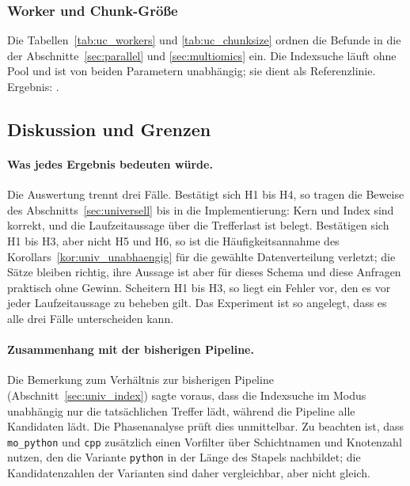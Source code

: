 \subsubsection{Worker und Chunk-Größe}


Die Tabellen~\ref{tab:uc_workers} und \ref{tab:uc_chunksize} ordnen die Befunde in die der Abschnitte~\ref{sec:parallel} und \ref{sec:multiomics} ein. Die Indexsuche läuft ohne Pool und ist von beiden Parametern unabhängig; sie dient als Referenzlinie. Ergebnis: .

\subsection{Diskussion und Grenzen}
\label{sec:ucx_diskussion}

\paragraph{Was jedes Ergebnis bedeuten würde.} Die Auswertung trennt drei Fälle. Bestätigt sich H1 bis H4, so tragen die Beweise des Abschnitts~\ref{sec:universell} bis in die Implementierung: Kern und Index sind korrekt, und die Laufzeitaussage über die Trefferlast ist belegt. Bestätigen sich H1 bis H3, aber nicht H5 und H6, so ist die Häufigkeitsannahme des Korollars~\ref{kor:univ_unabhaengig} für die gewählte Datenverteilung verletzt; die Sätze bleiben richtig, ihre Aussage ist aber für dieses Schema und diese Anfragen praktisch ohne Gewinn. Scheitern H1 bis H3, so liegt ein Fehler vor, den es vor jeder Laufzeitaussage zu beheben gilt. Das Experiment ist so angelegt, dass es alle drei Fälle unterscheiden kann.

\paragraph{Zusammenhang mit der bisherigen Pipeline.} Die Bemerkung zum Verhältnis zur bisherigen Pipeline (Abschnitt~\ref{sec:univ_index}) sagte voraus, dass die Indexsuche im Modus unabhängig nur die tatsächlichen Treffer lädt, während die Pipeline alle Kandidaten lädt. Die Phasenanalyse prüft dies unmittelbar. Zu beachten ist, dass \texttt{mo\_python} und \texttt{cpp} zusätzlich einen Vorfilter über Schichtnamen und Knotenzahl nutzen, den die Variante \texttt{python} in der Länge des Stapels nachbildet; die Kandidatenzahlen der Varianten sind daher vergleichbar, aber nicht gleich.

